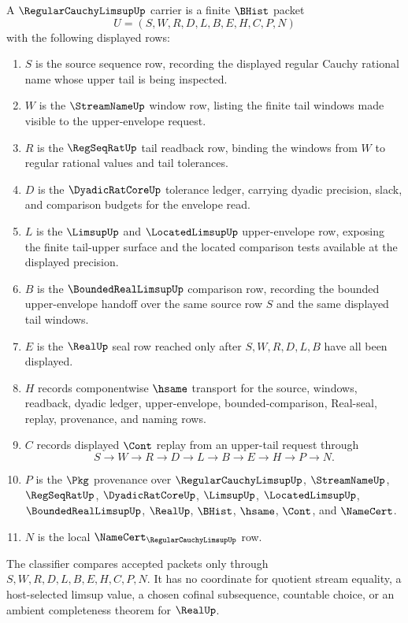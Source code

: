 \begin{definition}
\label{def:regular-cauchy-limsup-carrier}
A $\RegularCauchyLimsupUp$ carrier is a finite $\BHist$ packet
$$
U=(S,W,R,D,L,B,E,H,C,P,N)
$$
with the following displayed rows:
\begin{enumerate}
\item $S$ is the source sequence row, recording the displayed regular Cauchy rational name whose upper tail is being inspected.
\item $W$ is the $\StreamNameUp$ window row, listing the finite tail windows made visible to the upper-envelope request.
\item $R$ is the $\RegSeqRatUp$ tail readback row, binding the windows from $W$ to regular rational values and tail tolerances.
\item $D$ is the $\DyadicRatCoreUp$ tolerance ledger, carrying dyadic precision, slack, and comparison budgets for the envelope read.
\item $L$ is the $\LimsupUp$ and $\LocatedLimsupUp$ upper-envelope row, exposing the finite tail-upper surface and the located comparison tests available at the displayed precision.
\item $B$ is the $\BoundedRealLimsupUp$ comparison row, recording the bounded upper-envelope handoff over the same source row $S$ and the same displayed tail windows.
\item $E$ is the $\RealUp$ seal row reached only after $S,W,R,D,L,B$ have all been displayed.
\item $H$ records componentwise $\hsame$ transport for the source, windows, readback, dyadic ledger, upper-envelope, bounded-comparison, Real-seal, replay, provenance, and naming rows.
\item $C$ records displayed $\Cont$ replay from an upper-tail request through
$$
S \longrightarrow W \longrightarrow R \longrightarrow D \longrightarrow L \longrightarrow B \longrightarrow E \longrightarrow H \longrightarrow P \longrightarrow N .
$$
\item $P$ is the $\Pkg$ provenance over $\RegularCauchyLimsupUp$, $\StreamNameUp$, $\RegSeqRatUp$, $\DyadicRatCoreUp$, $\LimsupUp$, $\LocatedLimsupUp$, $\BoundedRealLimsupUp$, $\RealUp$, $\BHist$, $\hsame$, $\Cont$, and $\NameCert$.
\item $N$ is the local $\NameCert_{\RegularCauchyLimsupUp}$ row.
\end{enumerate}
The classifier compares accepted packets only through $S,W,R,D,L,B,E,H,C,P,N$. It has no coordinate for quotient stream equality, a host-selected limsup value, a chosen cofinal subsequence, countable choice, or an ambient completeness theorem for $\RealUp$.
\end{definition}

